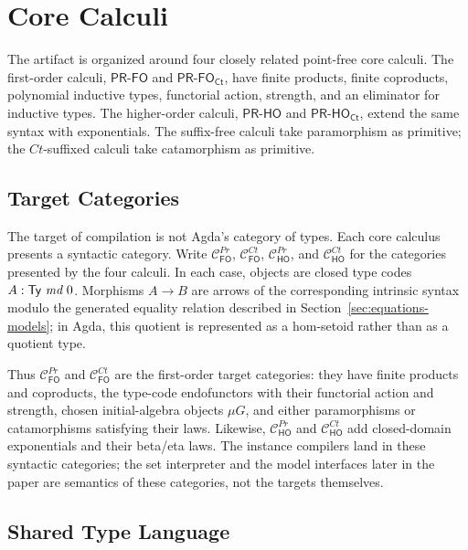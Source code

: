 \documentclass[sigplan,10pt,anonymous,review,screen]{acmart}
\newcommand{\PRFO}{\ensuremath{\mathsf{PR\mbox{-}FO}}}
\newcommand{\PRHO}{\ensuremath{\mathsf{PR\mbox{-}HO}}}
\newcommand{\PRFOCt}{\ensuremath{\mathsf{PR\mbox{-}FO_{Ct}}}}
\newcommand{\PRHOCt}{\ensuremath{\mathsf{PR\mbox{-}HO_{Ct}}}}
\begin{document}
\section{Core Calculi}
\label{sec:core-calculi}

The artifact is organized around four closely related point-free core
calculi.  The first-order calculi, \PRFO{} and \PRFOCt{}, have finite
products, finite coproducts, polynomial inductive types, functorial
action, strength, and an eliminator for inductive types.  The
higher-order calculi, \PRHO{} and \PRHOCt{}, extend the same syntax with
exponentials.  The suffix-free calculi take paramorphism as primitive;
the \(Ct\)-suffixed calculi take catamorphism as primitive.

\subsection{Target Categories}
\label{sec:target-categories}

The target of compilation is not Agda's category of types.  Each core
calculus presents a syntactic category.  Write
\(\mathcal{C}_{\mathsf{FO}}^{Pr}\),
\(\mathcal{C}_{\mathsf{FO}}^{Ct}\),
\(\mathcal{C}_{\mathsf{HO}}^{Pr}\), and
\(\mathcal{C}_{\mathsf{HO}}^{Ct}\) for the categories presented by the four
calculi.  In each case, objects are closed type codes
\(A : \AgdaDatatype{Ty}\ \AgdaBound{md}\ 0\).  Morphisms
\(A \to B\) are arrows of the corresponding intrinsic syntax modulo the
generated equality relation described in
Section~\ref{sec:equations-models}; in Agda, this quotient is represented
as a hom-setoid rather than as a quotient type.

Thus \(\mathcal{C}_{\mathsf{FO}}^{Pr}\) and
\(\mathcal{C}_{\mathsf{FO}}^{Ct}\) are the first-order target categories:
they have finite products and coproducts, the type-code endofunctors with
their functorial action and strength, chosen initial-algebra objects
\(\mu G\), and either paramorphisms or catamorphisms satisfying their laws.
Likewise, \(\mathcal{C}_{\mathsf{HO}}^{Pr}\) and
\(\mathcal{C}_{\mathsf{HO}}^{Ct}\) add closed-domain exponentials and their
beta/eta laws.  The instance compilers land in these syntactic
categories; the set interpreter and the model interfaces later in the
paper are semantics of these categories, not the targets themselves.

\subsection{Shared Type Language}
\label{sec:shared-type-language}
\end{document}
